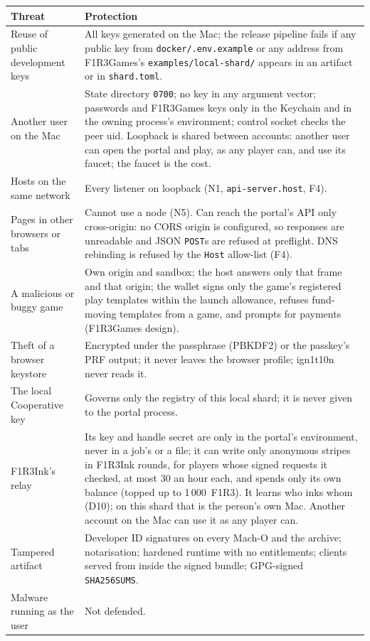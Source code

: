 \documentclass[11pt]{article}
\theoremstyle{definition}
\theoremstyle{remark}
\newcommand{\code}[1]{\texttt{#1}}
\newcommand{\Hr}{ign1t10n}
\newcommand{\Gm}{F1R3Games}
\begin{document}
\begin{center}\small
\renewcommand{\arraystretch}{1.15}
\begin{tabularx}{\linewidth}{@{}p{3.5cm}X@{}}
\toprule
Threat & Protection\\
\midrule
Reuse of public development keys & All keys generated on the Mac; the release pipeline fails if any public key from \code{docker/.env.example} or any address from \Gm{}'s \code{examples/local-shard/} appears in an artifact or in \code{shard.toml}.\\
Another user on the Mac & State directory \code{0700}; no key in any argument vector; passwords and \Gm{} keys only in the Keychain and in the owning process's environment; control socket checks the peer uid. Loopback is shared between accounts: another user can open the portal and play, as any player can, and use its faucet; the faucet is the cost.\\
Hosts on the same network & Every listener on loopback (N1, \code{api-server.host}, F4).\\
Pages in other browsers or tabs & Cannot use a node (N5). Can reach the portal's API only cross-origin: no CORS origin is configured, so responses are unreadable and JSON \code{POST}s are refused at preflight. DNS rebinding is refused by the \code{Host} allow-list (F4).\\
A malicious or buggy game & Own origin and sandbox; the host answers only that frame and that origin; the wallet signs only the game's registered play templates within the launch allowance, refuses fund-moving templates from a game, and prompts for payments (\Gm{} design).\\
Theft of a browser keystore & Encrypted under the passphrase (PBKDF2) or the passkey's PRF output; it never leaves the browser profile; \Hr{} never reads it.\\
The local Cooperative key & Governs only the registry of this local shard; it is never given to the portal process.\\
F1R3Ink's relay & Its key and handle secret are only in the portal's environment, never in a job's or a file; it can write only anonymous stripes in F1R3Ink rounds, for players whose signed requests it checked, at most 30 an hour each, and spends only its own balance (topped up to 1\,000~F1R3). It learns who inks whom (D10); on this shard that is the person's own Mac. Another account on the Mac can use it as any player can.\\
Tampered artifact & Developer ID signatures on every Mach-O and the archive; notarisation; hardened runtime with no entitlements; clients served from inside the signed bundle; GPG-signed \code{SHA256SUMS}.\\
Malware running as the user & Not defended.\\
\bottomrule
\end{tabularx}
\end{center}
\end{document}
